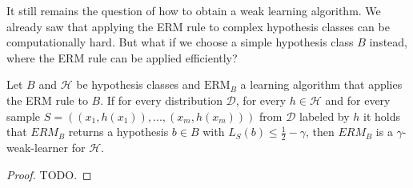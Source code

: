 It still remains the question of how to obtain a weak learning algorithm.
We already saw that applying the ERM rule to complex hypothesis classes can be computationally hard.
But what if we choose a simple hypothesis class $B$ instead, where the ERM rule can be applied efficiently?

\begin{theorem}
Let $B$ and $\mathcal{H}$ be hypothesis classes and $\text{ERM}_B$ a learning algorithm that applies the ERM rule to $B$.
If for every distribution $\mathcal{D}$, for every $h \in \mathcal{H}$ and for every sample
$S = ((x_1, h(x_1)), ..., (x_m, h(x_m)))$ from $\mathcal{D}$ labeled by $h$ it holds that
$ERM_B$ returns a hypothesis $b \in B$ with
$L_S(b) \leq \frac{1}{2} - \gamma$, then $ERM_B$ is a $\gamma$-weak-learner for $\mathcal{H}$.
\end{theorem}

\begin{proof}
	TODO.
\end{proof}
